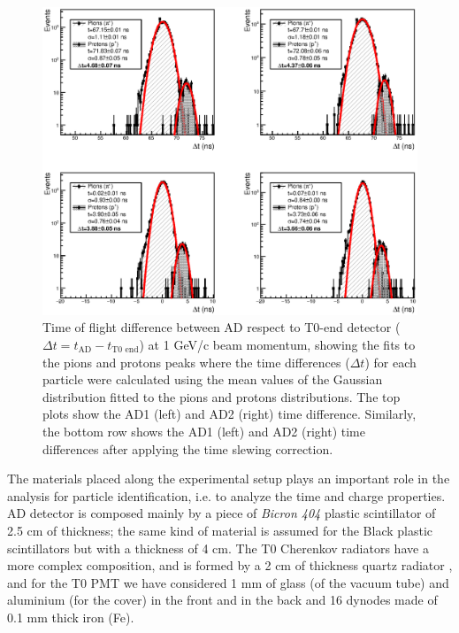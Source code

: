 		\begin{figure}[ht!]
			\begin{center}
				\includegraphics[scale=0.70]{./images/time/1GeV/NoteSlewH1.eps}%
				\caption{
		Time of flight difference  between AD  %
		respect to T0-end detector ($\Delta t= t_{\text{AD}}-t_{\text{T0 end}}$) at 1 GeV/c beam momentum, 
		showing the fits to the pions and protons peaks
		where the time differences ($\Delta t$) for each particle were calculated using the mean values of the Gaussian distribution
		fitted to the pions and protons distributions. %
		The top plots show the AD1 (left) and AD2 (right) time difference. Similarly,
		the bottom row shows the AD1 (left) and AD2 (right) time differences after applying the time slewing correction. 
					}
				\label{figure:Time_1GeV}
			\end{center}
		\end{figure}
	
	The materials placed along the experimental setup plays an important role in the analysis for particle 
	identification, i.e. to analyze the time and charge properties. AD detector is composed mainly by a piece of
	\textit{Bicron 404} \cite{BC404_Manual} plastic scintillator of 2.5 cm of thickness; the same kind of material
	is assumed for the Black plastic scintillators but with a thickness of 4 cm. %
	The T0 Cherenkov radiators have a more
	complex composition, and is formed by a 2 cm of thickness quartz radiator \cite{T0detector}, and  for the T0 PMT we have considered 1 mm of glass (of the vacuum tube) and aluminium (for the cover) in the front and in the back and 16 dynodes made of 0.1 mm thick iron (Fe).

